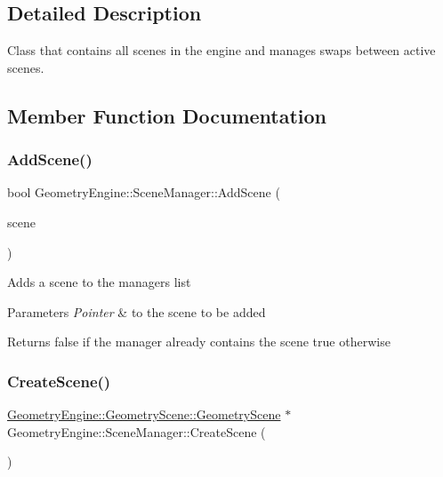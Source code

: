 \subsection{Detailed Description}
Class that contains all scenes in the engine and manages swaps between active scenes. 

\subsection{Member Function Documentation}
\mbox{\label{class_geometry_engine_1_1_scene_manager_afc4e192e195a131efe932048a8d68404}} 
\subsubsection{\texorpdfstring{AddScene()}{AddScene()}}
{\footnotesize\ttfamily bool Geometry\+Engine\+::\+Scene\+Manager\+::\+Add\+Scene (\begin{DoxyParamCaption}\item[{\mbox{\hyperlink{class_geometry_engine_1_1_geometry_scene_1_1_geometry_scene}{Geometry\+Scene\+::\+Geometry\+Scene}} $\ast$}]{scene }\end{DoxyParamCaption})}

Adds a scene to the manager\textquotesingle{}s list 
\begin{DoxyParams}{Parameters}
{\em Pointer} & to the scene to be added \\
\hline
\end{DoxyParams}
\begin{DoxyReturn}{Returns}
false if the manager already contains the scene true otherwise 
\end{DoxyReturn}
\mbox{\label{class_geometry_engine_1_1_scene_manager_aafc212a0eed6a49d411d06f03a73f943}} 
\subsubsection{\texorpdfstring{CreateScene()}{CreateScene()}\hspace{0.1cm}{\footnotesize\ttfamily [1/2]}}
{\footnotesize\ttfamily \mbox{\hyperlink{class_geometry_engine_1_1_geometry_scene_1_1_geometry_scene}{Geometry\+Engine\+::\+Geometry\+Scene\+::\+Geometry\+Scene}} $\ast$ Geometry\+Engine\+::\+Scene\+Manager\+::\+Create\+Scene (\begin{DoxyParamCaption}{ }\end{DoxyParamCaption})}

